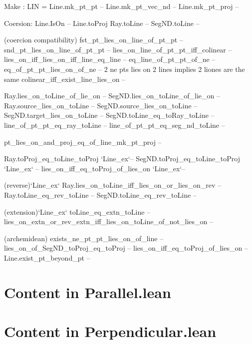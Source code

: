 \documentclass[12pt,a4paper]{article}
\begin{document}
  Make :
    LIN = Line.mk_pt_pt -- 
    Line.mk_pt_vec_nd --
    Line.mk_pt_proj --

  Coersion:
    Line.IsOn --
    Line.toProj
    Ray.toLine  --
    SegND.toLine --

  (coercion compatibility)
    fst_pt_lies_on_line_of_pt_pt --
    snd_pt_lies_on_line_of_pt_pt --
    lies_on_line_of_pt_pt_iff_colinear --
    lies_on_iff_lies_on_iff_line_eq_line --
    eq_line_of_pt_pt_of_ne --
    eq_of_pt_pt_lies_on_of_ne -- 2 ne pts lies on 2 lines implies 2 liones are the same
    colinear_iff_exist_line_lies_on --

    Ray.lies_on_toLine_of_lie_on --
    SegND.lies_on_toLine_of_lie_on --
    Ray.source_lies_on_toLine --
    SegND.source_lies_on_toLine --
    SegND.target_lies_on_toLine --
    SegND.toLine_eq_toRay_toLine --
    line_of_pt_pt_eq_ray_toLine --
    line_of_pt_pt_eq_seg_nd_toLine --

    pt_lies_on_and_proj_eq_of_line_mk_pt_proj --

    Ray.toProj_eq_toLine_toProj `Line_ex`--
    SegND.toProj_eq_toLine_toProj `Line_ex` --
    lies_on_iff_eq_toProj_of_lies_on `Line_ex`--

    (reverse)`Line_ex`
    Ray.lies_on_toLine_iff_lies_on_or_lies_on_rev --
    Ray.toLine_eq_rev_toLine --
    SegND.toLine_eq_rev_toLine --

    (extension)`Line_ex`
    toLine_eq_extn_toLine --
    lies_on_extn_or_rev_extn_iff_lies_on_toLine_of_not_lies_on --

    (archemidean)
    exists_ne_pt_pt_lies_on_of_line --
    lies_on_of_SegND_toProj_eq_toProj --
    lies_on_iff_eq_toProj_of_lies_on --
    Line.exist_pt_beyond_pt --
    

\section{Content in Parallel.lean}



\section{Content in Perpendicular.lean}
\end{document}
